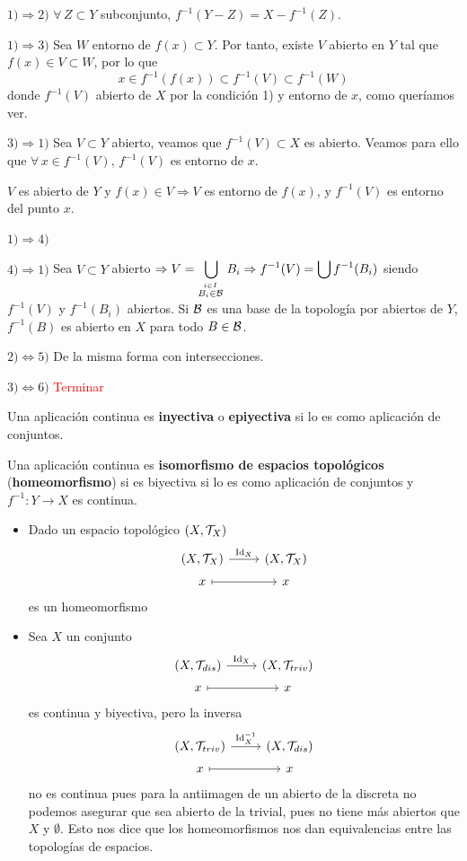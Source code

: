 \begin{dem}
    $1)\Rightarrow 2)$ $\forall \, Z \subset Y$ subconjunto, $f^{-1}(Y-Z) = X-f^{-1}(Z)$. 

    $1)\Rightarrow 3)$ Sea $W$ entorno de $f(x)\subset Y$. Por tanto, existe $V$ abierto en $Y$ tal que $f(x) \in V \subset W$, por lo que 
    $$x\in f^{-1}(f(x)) \subset f^{-1}(V) \subset f^{-1}(W)$$
    donde $f^{-1}(V)$ abierto de $X$ por la condici\'on 1) y entorno de $x$, como quer\'iamos ver.
    
    $3) \Rightarrow 1)$ Sea $V \subset Y$ abierto, veamos que $f^{-1}(V) \subset X$ es abierto. Veamos para ello que $\forall \, x\in f^{-1}(V), \, f^{-1}(V)$ es entorno de $x$. 

    $V$ es abierto de $Y$ y $f(x) \in V \Rightarrow V$ es entorno de $f(x)$, y $f^{-1}(V)$ es entorno del punto $x$. 
    
    $1) \Rightarrow 4)$

    $4) \Rightarrow 1)$ Sea $V \subset Y$ abierto $\Rightarrow V = \displaystyle \bigcup_{\overset{i\in I}{B_i \in \mathcal{B}} \, } B_i \Rightarrow f^{-1}(V) = \bigcup f^{-1}(B_i)$ siendo $f^{-1}(V) $ y $f^{-1}(B_i)$ abiertos. Si $\mathcal{B}$ es una base de la topolog\'ia por abiertos de $Y$, $f^{-1}(B)$ es abierto en $X$ para todo $B\in \mathcal{B}$. 
    
    $2) \iff 5)$ De la misma forma con intersecciones. 

    $3) \iff 6)$ \textcolor{red}{Terminar}
\end{dem}
\begin{defi}
    Una aplicaci\'on continua es \textbf{inyectiva} o \textbf{epiyectiva} si lo es como aplicaci\'on de conjuntos.

    Una aplicaci\'on continua es \textbf{isomorfismo de espacios topológicos} (\textbf{homeomorfismo}) si es biyectiva si lo es como aplicaci\'on de conjuntos y $f^{-1}: Y \longrightarrow X$ es continua.
\end{defi}
\begin{ejem}
    \begin{itemize} 
        \item Dado un espacio topológico $(X,\mathcal{T}_X)$
        $$\bt (X, \mc T_X) \rar{\text{Id}_X} & (X, \mc T_X) \\[-5mm] x \rarmaps & x \et$$
        es un homeomorfismo
        \item Sea $X$ un conjunto
        $$\bt (X, \mc T_{dis}) \rar{\text{Id}_X} & (X, \mc T_{triv}) \\[-5mm] x \rarmaps & x \et$$
        es continua y biyectiva, pero la inversa 
        $$\bt (X, \mc T_{triv}) \rar{\text{Id}_X^{-1}} & (X, \mc T_{dis}) \\[-5mm] x \rarmaps & x \et$$
        no es continua pues para la antiimagen de un abierto de la discreta no podemos asegurar que sea abierto de la trivial, pues no tiene m\'as abiertos que $X$ y $\emptyset$. Esto nos dice que los homeomorfismos nos dan equivalencias entre las topologías de espacios. 
    \end{itemize}
\end{ejem}
